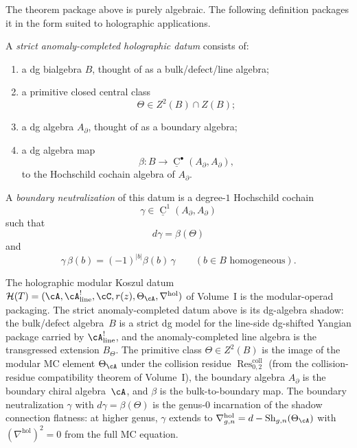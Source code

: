 The theorem package above is purely algebraic.
The following definition packages it in the form suited to holographic applications.

\begin{definition}
\label{def:tholog-strict-holographic-datum}
A \emph{strict anomaly-completed holographic datum} consists of:
\begin{enumerate}
\item a dg bialgebra \(B\), thought of as a bulk/defect/line algebra;
\item a primitive closed central class
\[
\Theta\in Z^{2}(B)\cap Z(B);
\]
\item a dg algebra \(A_{\partial}\), thought of as a boundary algebra;
\item a dg algebra map
\[
\beta:B\longrightarrow \underline{\operatorname{C}}^{\bullet}(A_{\partial},A_{\partial}),
\]
to the Hochschild cochain algebra of \(A_{\partial}\).
\end{enumerate}
A \emph{boundary neutralization} of this datum is a degree-\(1\) Hochschild cochain
\[
\gamma\in \underline{\operatorname{C}}^{1}(A_{\partial},A_{\partial})
\]
such that
\[
d\gamma=\beta(\Theta)
\]
and
\[
\gamma\,\beta(b)=(-1)^{|b|}\beta(b)\,\gamma
\qquad (b\in B \text{ homogeneous}).
\]
\end{definition}

\begin{remark}
\label{rem:tholog-hmkd-comparison}
The holographic modular Koszul datum
$\mathcal H(T) = (\cA,\cA^!_{\mathrm{line}},\cC,r(z),\Theta_\cA,
\nabla^{\mathrm{hol}})$
of Volume~I
is the modular-operad packaging. The strict anomaly-completed
datum above is its dg-algebra shadow: the bulk/defect algebra~$B$
is a strict dg model for the line-side dg-shifted Yangian package
carried by $\cA^!_{\mathrm{line}}$, and the anomaly-completed line
algebra is the transgressed extension $B_{\Theta}$. The primitive class
$\Theta\in Z^2(B)$ is the image of the modular MC element
$\Theta_\cA$ under the collision residue
$\operatorname{Res}^{\mathrm{coll}}_{0,2}$
(from the collision-residue compatibility theorem of Volume~I),
the boundary algebra $A_\partial$ is the boundary chiral
algebra~$\cA$, and $\beta$ is the bulk-to-boundary map. The
boundary neutralization $\gamma$ with $d\gamma=\beta(\Theta)$
is the genus-$0$ incarnation of the shadow connection flatness:
at higher genus, $\gamma$ extends to
$\nabla^{\mathrm{hol}}_{g,n}=d-\operatorname{Sh}_{g,n}(\Theta_\cA)$
with $(\nabla^{\mathrm{hol}})^2=0$ from the full MC equation.
\end{remark}

